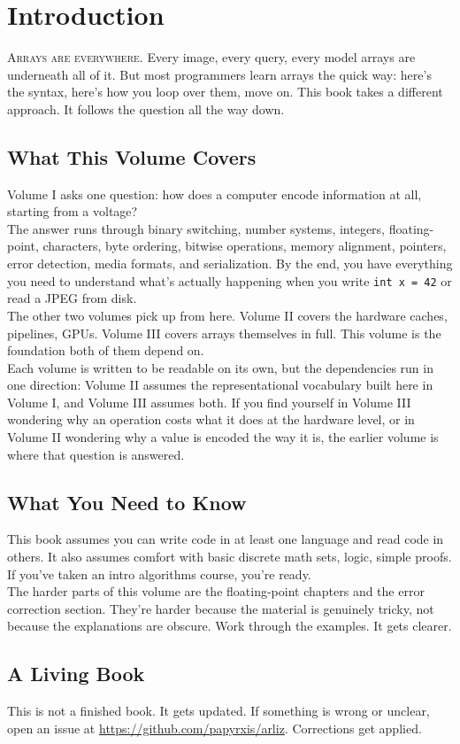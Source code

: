 {\small \linespread{1.1}\selectfont
\chapter*{Introduction}

\lettrine{A}{rrays are everywhere}. Every image, every query, every model arrays are underneath all of it. But most programmers learn arrays the quick way: here's the syntax, here's how you loop over them, move on. This book takes a different approach. It follows the question all the way down.

\section*{What This Volume Covers}

Volume I asks one question: how does a computer encode information at all, starting from a voltage?\\
The answer runs through binary switching, number systems, integers, floating-point, characters, byte ordering, bitwise operations, memory alignment, pointers, error detection, media formats, and serialization. By the end, you have everything you need to understand what's actually happening when you write \texttt{int x = 42} or read a JPEG from disk.\\
The other two volumes pick up from here. Volume II covers the hardware caches, pipelines, GPUs. Volume III covers arrays themselves in full. This volume is the foundation both of them depend on.\\
Each volume is written to be readable on its own, but the dependencies run in one direction: Volume II assumes the representational vocabulary built here in Volume I, and Volume III assumes both. If you find yourself in Volume III wondering why an operation costs what it does at the hardware level, or in Volume II wondering why a value is encoded the way it is, the earlier volume is where that question is answered.

\section*{What You Need to Know}

This book assumes you can write code in at least one language and read code in others. It also assumes comfort with basic discrete math sets, logic, simple proofs. If you've taken an intro algorithms course, you're ready.\\
The harder parts of this volume are the floating-point chapters and the error correction section. They're harder because the material is genuinely tricky, not because the explanations are obscure. Work through the examples. It gets clearer.

\section*{A Living Book}

This is not a finished book. It gets updated. If something is wrong or unclear, open an issue at \url{https://github.com/papyrxis/arliz}. Corrections get applied.

\vfill
\clearpage
}
